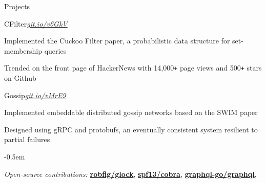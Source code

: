 \documentclass{resume} %
\begin{document}

\begin{rSection}{Projects}
  \begin{rSubsection}{CFilter}{\em{\href{https://git.io/v6GkV}{git.io/v6GkV}}}{}

    \item Implemented the Cuckoo Filter paper, a probabilistic data structure for
      set-membership queries
    \item Trended on the front page of HackerNews with 14,000\texttt{+} page
      views and 500\texttt{+} stars on Github
  \end{rSubsection}

  \begin{rSubsection}{Gossip}{\em{\href{https://git.io/vMrE9}{git.io/vMrE9}}}{}

    \item Implemented embeddable distributed gossip networks based on the SWIM
      paper
    \item Designed using gRPC and protobufs, an eventually consistent system
      resilient to partial failures
  \end{rSubsection}

  \begin{list}{}{\leftmargin=0.0em}
  \itemsep -0.5em \vspace{-0.0em}
  \item {\em Open-source contributions:}
    \href{https://github.com/robfig/glock}{\textbf{robfig/glock}},
    \href{https://github.com/spf13/cobra}{\textbf{spf13/cobra}},
    \href{https://github.com/graphql-go/graphql}{\textbf{graphql-go/graphql}},
  \end{list}
  \vspace{0.5em}





\end{rSection}
\end{document}
